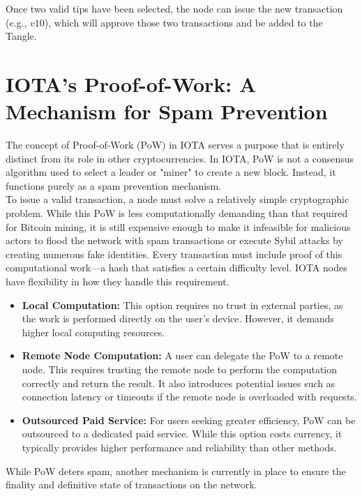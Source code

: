 \documentclass{scrbook}
\begin{document}
Once two valid tips have been selected, the node can issue the new transaction (e.g., $v10$), which will approve those two transactions and be added to the Tangle.

\section{IOTA's Proof-of-Work: A Mechanism for Spam Prevention}

The concept of Proof-of-Work (PoW) in IOTA serves a purpose that is entirely distinct from its role in other cryptocurrencies. In IOTA, PoW is not a consensus algorithm used to select a leader or "miner" to create a new block. Instead, it functions purely as a spam prevention mechanism.\\

To issue a valid transaction, a node must solve a relatively simple cryptographic problem. While this PoW is less computationally demanding than that required for Bitcoin mining, it is still expensive enough to make it infeasible for malicious actors to flood the network with spam transactions or execute Sybil attacks by creating numerous fake identities. Every transaction must include proof of this computational work—a hash that satisfies a certain difficulty level. IOTA nodes have flexibility in how they handle this requirement.

\begin{itemize}
    \item \textbf{Local Computation:} This option requires no trust in external parties, as the work is performed directly on the user's device. However, it demands higher local computing resources.
    \item \textbf{Remote Node Computation:} A user can delegate the PoW to a remote node. This requires trusting the remote node to perform the computation correctly and return the result. It also introduces potential issues such as connection latency or timeouts if the remote node is overloaded with requests.
    \item \textbf{Outsourced Paid Service:} For users seeking greater efficiency, PoW can be outsourced to a dedicated paid service. While this option costs currency, it typically provides higher performance and reliability than other methods.
\end{itemize}

While PoW deters spam, another mechanism is currently in place to ensure the finality and definitive state of transactions on the network.
\end{document}
